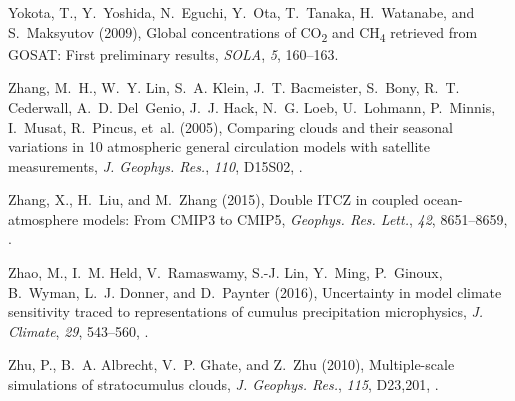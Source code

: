 \documentclass[draft]{agujournal}
\begin{document}
\begin{thebibliography}{196}
Yokota, T., Y.~Yoshida, N.~Eguchi, Y.~Ota, T.~Tanaka, H.~Watanabe, and
  S.~Maksyutov (2009), Global concentrations of {CO\textsubscript{2}} and
  {CH\textsubscript{4}} retrieved from {GOSAT}: First preliminary results,
  \textit{SOLA}, \textit{5}, 160--163.

Zhang, M.~H., W.~Y. Lin, S.~A. Klein, J.~T. Bacmeister, S.~Bony, R.~T.
  Cederwall, A.~D. Del~Genio, J.~J. Hack, N.~G. Loeb, U.~Lohmann, P.~Minnis,
  I.~Musat, R.~Pincus, et~al. (2005), Comparing clouds and their seasonal
  variations in 10 atmospheric general circulation models with satellite
  measurements, \textit{J. Geophys. Res.}, \textit{110}, D15S02,
  .

Zhang, X., H.~Liu, and M.~Zhang (2015), Double {ITCZ} in coupled
  ocean-atmosphere models: From {CMIP3} to {CMIP5}, \textit{Geophys. Res.
  Lett.}, \textit{42}, 8651--8659, .

Zhao, M., I.~M. Held, V.~Ramaswamy, S.-J. Lin, Y.~Ming, P.~Ginoux, B.~Wyman,
  L.~J. Donner, and D.~Paynter (2016), Uncertainty in model climate sensitivity
  traced to representations of cumulus precipitation microphysics, \textit{J.
  Climate}, \textit{29}, 543--560, .

Zhu, P., B.~A. Albrecht, V.~P. Ghate, and Z.~Zhu (2010), Multiple-scale
  simulations of stratocumulus clouds, \textit{J. Geophys. Res.}, \textit{115},
  D23,201, .

\end{thebibliography}





\end{document}
